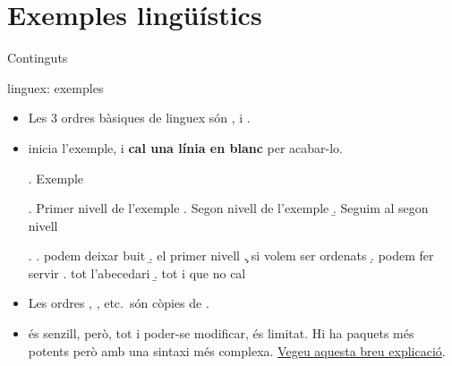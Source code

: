 \section{Exemples lingüístics}\label{sec:exemples_ling}
\begin{frame}{Continguts}
\begin{multicols}{2}
\tableofcontents[currentsection]
\end{multicols}
\end{frame}


\begin{frame}[fragile]{linguex: exemples}
\begin{itemize}
\item Les 3 ordres bàsiques de linguex són ,  i .
\item {} inicia l'exemple, i \textbf{cal una línia en blanc} per acabar-lo.
\begin{exampletwouptiny2}
\ex. Exemple

\ex. Primer nivell de l'exemple
\a. Segon nivell de l'exemple
\b. Seguim al segon nivell

\ex.
\a. podem deixar buit
\b. el primer nivell
\c. si volem ser ordenats
\d. podem fer servir
\e. tot l'abecedari
\b. tot i que no cal

\end{exampletwouptiny2}
\item Les ordres , , etc.~són còpies de .
\item {} és senzill, però, tot i poder-se modificar, és limitat. Hi ha paquets més potents però amb una sintaxi més complexa. \href{https://www.jostellings.com/numbex.html}{Vegeu aquesta breu explicació}.
\end{itemize}
\end{frame}

